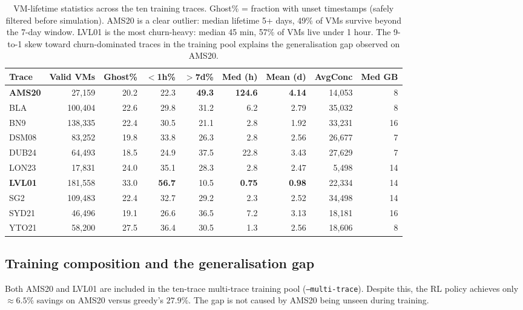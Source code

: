 \documentclass[11pt]{article}
\begin{document}
\begin{table}[H]
\centering
\small
\begin{tabular}{lrrrrrrrr}
\toprule
\textbf{Trace} & \textbf{Valid VMs} & \textbf{Ghost\%} & \textbf{$<$1h\%} & \textbf{$>$7d\%} & \textbf{Med (h)} & \textbf{Mean (d)} & \textbf{AvgConc} & \textbf{Med GB} \\
\midrule
\textbf{AMS20}   & 27{,}159  & 20.2 & 22.3 & \textbf{49.3} & \textbf{124.6} & \textbf{4.14} & 14{,}053 & 8  \\
BLA              & 100{,}404 & 22.6 & 29.8 & 31.2 &   6.2 & 2.79 & 35{,}032 & 8  \\
BN9              & 138{,}335 & 22.4 & 30.5 & 21.1 &   2.8 & 1.92 & 33{,}231 & 16 \\
DSM08            &  83{,}252 & 19.8 & 33.8 & 26.3 &   2.8 & 2.56 & 26{,}677 & 7  \\
DUB24            &  64{,}493 & 18.5 & 24.9 & 37.5 &  22.8 & 3.43 & 27{,}629 & 7  \\
LON23            &  17{,}831 & 24.0 & 35.1 & 28.3 &   2.8 & 2.47 &  5{,}498 & 14 \\
\textbf{LVL01}   & 181{,}558 & 33.0 & \textbf{56.7} & 10.5 & \textbf{0.75} & \textbf{0.98} & 22{,}334 & 14 \\
SG2              & 109{,}483 & 22.4 & 32.7 & 29.2 &   2.3 & 2.52 & 34{,}498 & 14 \\
SYD21            &  46{,}496 & 19.1 & 26.6 & 36.5 &   7.2 & 3.13 & 18{,}181 & 16 \\
YTO21            &  58{,}200 & 27.5 & 36.4 & 30.5 &   1.3 & 2.56 & 18{,}606 & 8  \\
\bottomrule
\end{tabular}
\caption{VM-lifetime statistics across the ten training traces.
  Ghost\% = fraction with unset timestamps (safely filtered before simulation).
  AMS20 is a clear outlier: median lifetime 5+ days, 49\% of VMs survive beyond the 7-day window.
  LVL01 is the most churn-heavy: median 45 min, 57\% of VMs live under 1 hour.
  The 9-to-1 skew toward churn-dominated traces in the training pool
  explains the generalisation gap observed on AMS20.}
\label{tab:traces}
\end{table}

\subsection{Training composition and the generalisation gap}

Both AMS20 and LVL01 are included in the ten-trace multi-trace training
pool (\texttt{--multi-trace}).  Despite this, the RL policy achieves only
$\approx6.5\%$ savings on AMS20 versus greedy's $27.9\%$.
The gap is not caused by AMS20 being unseen during training.
\end{document}

